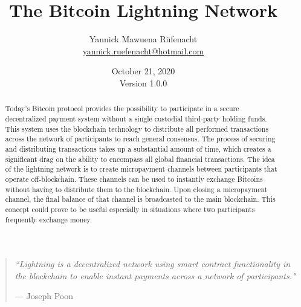 \documentclass[a4paper, 12pt]{report}
\newcommand{\hsp}{\hspace{20pt}}
\begin{document}
\title{\Large{\textbf{The Bitcoin Lightning Network}}}
\author{Yannick Mawuena Rüfenacht \\ \href{mailto:yannick.ruefenacht@hotmail.com}{yannick.ruefenacht@hotmail.com}}
\date{October 21, 2020\\Version 1.0.0}
\maketitle

\begin{quote}
\vspace*{\fill}
\textit{``Lightning is a decentralized network using smart contract functionality in the blockchain to enable instant payments across a network of participants."}
\par\raggedleft--- \textup{Joseph Poon}
\vspace*{\fill}
\end{quote}

\begin{abstract}
Today’s Bitcoin protocol provides the possibility to participate in a secure decentralized payment system without a single custodial third-party holding funds. This system uses the blockchain technology to distribute all performed transactions across the network of participants to reach general consensus. The process of securing and distributing transactions takes up a substantial amount of time, which creates a significant drag on the ability to encompass all global financial transactions. The idea of the lightning network is to create micropayment channels between participants that operate off-blockchain. These channels can be used to instantly exchange Bitcoins without having to distribute them to the blockchain. Upon closing a micropayment channel, the final balance of that channel is broadcasted to the main blockchain. This concept could prove to be useful especially in situations where two participants frequently exchange money.
\end{abstract}

\tableofcontents
\listoffigures

\setlength{\parskip}{1em}
\setlength{\parindent}{0em}
\titleformat{\chapter}[hang]{\LARGE\bfseries}{\thechapter\hsp\textcolor{gray75}{|}\hsp}{0pt}{\LARGE\bfseries}
\titleformat{\section}[hang]{\large\bfseries}{\thesection\hsp\textcolor{gray75}{|}\hsp}{0pt}{\large\bfseries}
\end{document}
